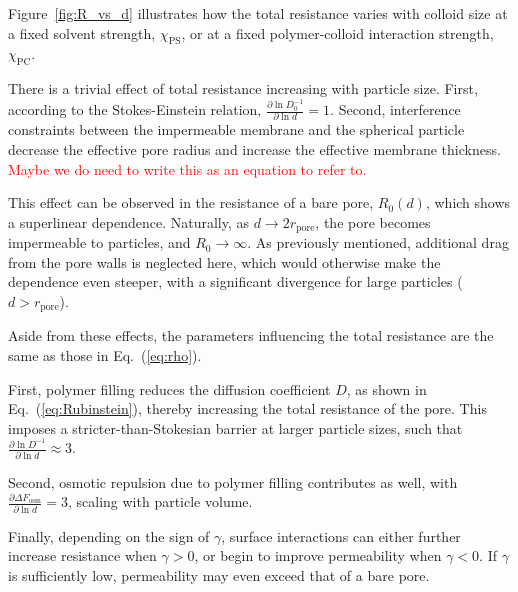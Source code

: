 \documentclass[12pt, a4paper]{article}
\newcommand\todo[1]{\textcolor{red}{#1}}
\begin{document}
Figure~\ref{fig:R_vs_d} illustrates how the total resistance varies with colloid size at a fixed solvent strength, $\chi_{\text{PS}}$, or at a fixed polymer-colloid interaction strength, $\chi_{\text{PC}}$.

There is a trivial effect of total resistance increasing with particle size. First, according to the Stokes-Einstein relation, $\frac{\partial \ln D_0^{-1}}{\partial \ln d} = 1$. Second, interference constraints between the impermeable membrane and the spherical particle decrease the effective pore radius and increase the effective membrane thickness.
\todo{Maybe we do need to write this as an equation to refer to.}

This effect can be observed in the resistance of a bare pore, $R_0(d)$, which shows a superlinear dependence.
Naturally, as $d \to 2r_{\text{pore}}$, the pore becomes impermeable to particles, and $R_0 \to \infty$.
As previously mentioned, additional drag from the pore walls is neglected here, which would otherwise make the dependence even steeper, with a significant divergence for large particles ($d > r_{\text{pore}}$).

Aside from these effects, the parameters influencing the total resistance are the same as those in Eq.~(\ref{eq:rho}).

First, polymer filling reduces the diffusion coefficient $D$, as shown in Eq.~(\ref{eq:Rubinstein}), thereby increasing the total resistance of the pore.
This imposes a stricter-than-Stokesian barrier at larger particle sizes, such that $\frac{\partial \ln D^{-1}}{\partial \ln d} \approx 3$.

Second, osmotic repulsion due to polymer filling contributes as well, with $\frac{\partial \Delta F_{\text{osm}}}{\partial \ln d} = 3$, scaling with particle volume.

Finally, depending on the sign of $\gamma$, surface interactions can either further increase resistance when $\gamma > 0$, or begin to improve permeability when $\gamma < 0$.
If $\gamma$ is sufficiently low, permeability may even exceed that of a bare pore.
\end{document}

